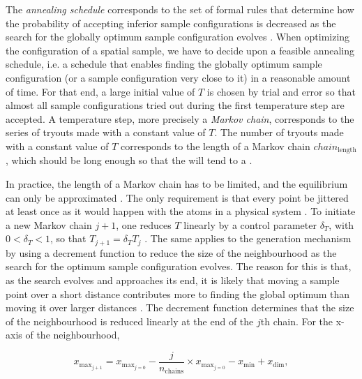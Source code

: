The \emph{annealing schedule} corresponds to the set of formal rules that determine how the probability of 
accepting inferior sample configurations is decreased as the search for the globally optimum sample 
configuration evolves \cite{AartsEtAl1989, Groenigen1999a, WebsterEtAl2013}. When optimizing the configuration 
of a spatial sample, we have to decide upon a feasible annealing schedule, i.e. a schedule that enables finding 
the globally optimum sample configuration (or a sample configuration very close to it) in a reasonable amount 
of time. For that end, a large initial value of $T$ is chosen by trial and error so that almost all sample 
configurations tried out during the first temperature step are accepted. A temperature step, more precisely a 
\emph{Markov chain}, corresponds to the series of tryouts made with a constant value of $T$. The number of 
tryouts made with a constant value of $T$ corresponds to the length of a Markov chain $chain_\text{length}$, 
which should be long enough so that the  will tend to a .

In practice, the length of a Markov chain has to be limited, and the equilibrium can only be approximated 
\cite{WebsterEtAl2013}. The only requirement is that every point be jittered at least once as it would happen 
with the atoms in a physical system \cite{MetropolisEtAl1953}. To initiate a new Markov chain $j + 1$, one 
reduces $T$ linearly by a control parameter $\delta_{T}$, with $0 < \delta_{T} < 1$, so that $T_{j + 1} = 
\delta_{T}T_j$ \cite{AartsEtAl1989}. The same applies to the generation mechanism by using a decrement function 
to reduce the size of the neighbourhood as the search for the optimum sample configuration evolves. The reason 
for this is that, as the search evolves and approaches its end, it is likely that moving a sample point over a 
short distance contributes more to finding the global optimum than moving it over larger distances 
\cite{GroenigenEtAl1998}. The decrement function determines that the size of the neighbourhood is reduced 
linearly at the end of the $j$th chain. For the x-axis of the neighbourhood,

\begin{equation} %
x_{\text{max}_{j + 1}} = x_{\text{max}_{j = 0}} - \frac{j}{n_\text{chains}} \times x_{\text{max}_{j = 0}} - 
                                           x_\text{min} + x_\text{dim},
\end{equation}

